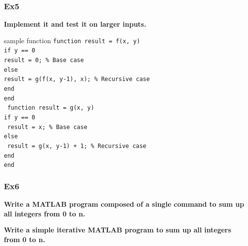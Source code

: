 \documentclass[
	11pt, %
]{beamer}
\begin{document}
\begin{frame}
    \frametitle{Ex5}

    \textbf{Implement it and test it on larger inputs.}
    \begin{block}{sample function}
        \texttt{function result = f(x, y)}
        \\\quad \texttt{if y == 0}
        \\\quad  \quad \texttt{result = 0; \% Base case}
        \\\quad   \texttt{else}
        \\\quad  \quad \texttt{result = g(f(x, y-1), x); \% Recursive case}
        \\\quad   \texttt{end}
    \\\texttt{end}
\\
    \texttt{ function result = g(x, y)}
    \\\quad \texttt{if y == 0}
    \\\quad  \quad \texttt{ result = x; \% Base case}
    \\\quad   \texttt{else}
    \\\quad  \quad \texttt{ result = g(x, y-1) + 1; \% Recursive case}
    \\\quad   \texttt{end}
    \\\texttt{end}
   
    \end{block}

\end{frame}



\begin{frame}
	\frametitle{Ex6}

	\textbf{ Write a MATLAB program composed of a single command to sum up all integers from 0 to n.}
    
    \bigskip
    
    \bigskip

    \textbf{Write a simple iterative MATLAB program to sum up all integers from 0 to n.}
    
    \bigskip

\end{frame}

\end{document}
